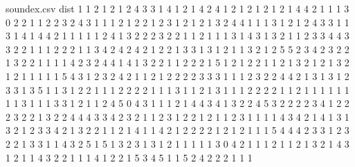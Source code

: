 \begin{filecontents}{soundex.csv}
    dist
    1
    1
    2
    1
    2
    1
    2
    4
    3
    3
    1
    4
    1
    2
    1
    4
    2
    4
    1
    2
    1
    2
    1
    2
    1
    2
    1
    4
    4
    2
    1
    1
    1
    3
    0
    2
    2
    1
    1
    2
    2
    3
    2
    4
    3
    1
    1
    1
    2
    1
    2
    2
    1
    2
    3
    1
    2
    1
    2
    1
    3
    2
    4
    4
    1
    1
    1
    3
    1
    2
    1
    2
    4
    3
    3
    1
    1
    3
    1
    4
    1
    4
    4
    2
    1
    1
    1
    1
    1
    2
    4
    1
    3
    2
    2
    2
    3
    2
    2
    1
    1
    2
    1
    1
    1
    3
    1
    4
    3
    1
    3
    2
    1
    1
    2
    3
    3
    4
    4
    3
    3
    2
    2
    1
    1
    1
    2
    2
    2
    1
    1
    3
    4
    2
    4
    2
    4
    2
    1
    2
    2
    1
    3
    3
    1
    3
    1
    2
    1
    1
    3
    2
    1
    2
    5
    5
    2
    3
    4
    2
    3
    2
    2
    1
    3
    2
    2
    1
    1
    1
    1
    4
    2
    3
    2
    4
    4
    1
    4
    1
    3
    2
    2
    1
    1
    2
    2
    2
    1
    5
    1
    2
    1
    2
    2
    1
    1
    2
    1
    3
    2
    1
    2
    1
    3
    2
    1
    2
    1
    1
    1
    1
    1
    5
    4
    3
    1
    2
    3
    2
    4
    2
    1
    1
    2
    1
    2
    2
    2
    2
    3
    3
    3
    1
    1
    1
    2
    3
    2
    2
    4
    4
    2
    1
    3
    1
    3
    1
    2
    3
    3
    1
    3
    5
    1
    1
    3
    1
    2
    2
    1
    1
    1
    2
    2
    2
    2
    1
    1
    1
    3
    1
    1
    2
    1
    3
    1
    1
    1
    2
    2
    2
    2
    1
    1
    2
    1
    1
    1
    1
    1
    1
    1
    1
    3
    1
    1
    1
    3
    3
    1
    2
    1
    1
    2
    4
    5
    0
    4
    3
    1
    1
    1
    2
    1
    4
    4
    3
    4
    1
    3
    2
    2
    4
    5
    3
    2
    2
    2
    2
    3
    4
    1
    2
    2
    2
    3
    2
    2
    1
    3
    2
    2
    4
    4
    4
    3
    3
    4
    2
    3
    2
    1
    1
    2
    3
    1
    2
    2
    1
    2
    1
    1
    2
    3
    1
    1
    1
    1
    4
    3
    4
    2
    1
    4
    1
    3
    1
    3
    2
    1
    2
    3
    3
    4
    2
    1
    3
    2
    2
    1
    1
    2
    1
    4
    1
    1
    4
    2
    1
    2
    2
    2
    2
    1
    2
    1
    2
    1
    1
    1
    5
    4
    4
    4
    2
    3
    3
    1
    2
    3
    2
    2
    1
    3
    3
    1
    1
    4
    3
    2
    5
    1
    5
    1
    3
    2
    3
    1
    3
    1
    2
    1
    1
    1
    1
    1
    3
    0
    4
    2
    1
    1
    1
    2
    1
    1
    2
    1
    3
    2
    1
    4
    3
    1
    2
    1
    1
    4
    3
    2
    2
    1
    1
    1
    4
    1
    2
    2
    1
    5
    3
    4
    5
    1
    1
    5
    2
    4
    2
    2
    2
    1
    1
    1
\end{filecontents}


    